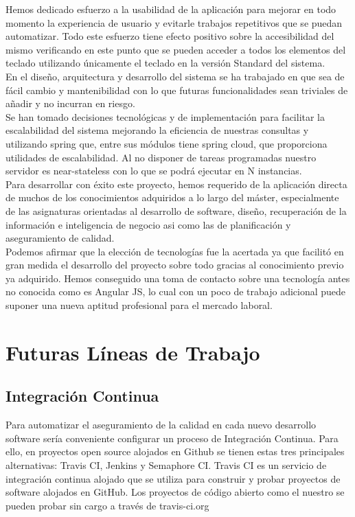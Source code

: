 \documentclass[12pt, a4paper, twoside]{book}
\begin{document}
	Hemos dedicado esfuerzo a la usabilidad de la aplicación para mejorar en todo momento la experiencia de usuario y evitarle trabajos repetitivos que se puedan automatizar. Todo este esfuerzo tiene efecto positivo sobre la accesibilidad del mismo verificando en este punto que se pueden acceder a todos los elementos del teclado utilizando únicamente el teclado en la versión Standard del sistema.\\
	En el diseño, arquitectura y desarrollo del sistema se ha trabajado en que sea de fácil cambio y mantenibilidad con lo que futuras funcionalidades sean triviales de añadir y no incurran en riesgo.\\
	Se han tomado decisiones tecnológicas y de implementación para facilitar la escalabilidad del sistema mejorando la eficiencia de nuestras consultas y utilizando spring que, entre sus módulos tiene spring cloud, que proporciona utilidades de escalabilidad. Al no disponer de tareas programadas nuestro servidor es near-stateless con lo que se podrá ejecutar en N instancias.\\
	Para desarrollar con éxito este proyecto, hemos requerido de la aplicación directa de muchos de los conocimientos adquiridos a lo largo del máster, especialmente de las asignaturas orientadas al desarrollo de software, diseño, recuperación de la información e inteligencia de negocio asi como las de planificación y aseguramiento de calidad.\\
	Podemos afirmar que la elección de tecnologías fue la acertada ya que facilitó en gran medida el desarrollo del proyecto sobre todo gracias al conocimiento previo ya adquirido. Hemos conseguido una toma de contacto sobre una tecnología antes no conocida como es Angular JS, lo cual con un poco de trabajo adicional puede suponer una nueva aptitud profesional para el mercado laboral.
	\section{Futuras Líneas de Trabajo}
	\subsection{Integración Continua}
	Para automatizar el aseguramiento de la calidad en cada nuevo desarrollo software sería conveniente configurar un proceso de Integración Continua. 
	Para ello, en proyectos open source alojados en Github se tienen estas tres principales alternativas: Travis CI, Jenkins y Semaphore CI.
	Travis CI es un servicio de integración continua alojado que se utiliza para construir y probar proyectos de software alojados en GitHub. Los proyectos de código abierto como el nuestro se pueden probar sin cargo a través de travis-ci.org
\end{document}

